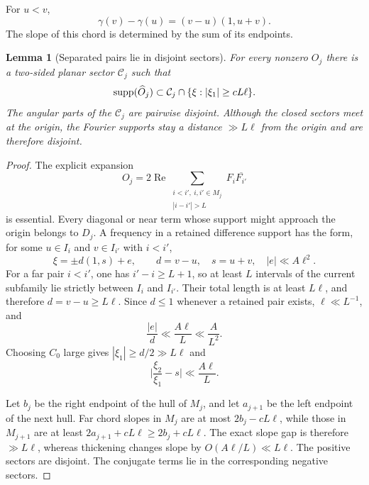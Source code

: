 \documentclass{amsart}
\numberwithin{equation}{section}
\newtheorem{lemma}[theorem]{Lemma}
\newcommand{\supp}{{\rm supp}}
\begin{document}
For $u<v$,
\begin{equation}\label{eq:chord-direction}
 \gamma(v)-\gamma(u)=(v-u)(1,u+v).
\end{equation}
The slope of this chord is determined by the sum of its endpoints.

\begin{lemma}[Separated pairs lie in disjoint sectors]\label{lem:chord-sectors}
For every nonzero $O_j$ there is a two-sided planar sector $\mathcal C_j$
such that
\[
 \supp(\widehat O_j)
 \subset \mathcal C_j\cap\{\xi:|\xi_1|\ge cL\ell\}.
\]
The angular parts of the $\mathcal C_j$ are pairwise disjoint.  Although the
closed sectors meet at the origin, the Fourier supports stay a distance
$\gg L\ell$ from the origin and are therefore disjoint.
\end{lemma}

\begin{proof}
The explicit expansion
\[
 O_j=2\operatorname{Re}
 \sum_{\substack{i<i',\ i,i'\in M_j\\
       |i-i'|>L}}
 F_i\overline{F_{i'}}
\]
is essential.  Every diagonal or near term whose support might approach
the origin belongs to $D_j$.  A frequency in a retained difference support
has the form, for some $u\in I_i$ and $v\in I_{i'}$ with $i<i'$,
\[
 \xi=\pm d(1,s)+e,
 \qquad d=v-u,\quad s=u+v,\quad |e|\ll A\ell^2.
\]
For a far pair $i<i'$, one has $i'-i\ge L+1$, so at least $L$ intervals of the
current subfamily lie strictly between $I_i$ and $I_{i'}$.  Their total length
is at least $L\ell$, and therefore $d=v-u\ge L\ell$.  Since $d\le1$ whenever a
retained pair exists, $\ell\ll L^{-1}$, and
\[
 \frac{|e|}{d}\ll\frac{A\ell}{L}\ll\frac{A}{L^2}.
\]
Choosing $C_0$ large gives $|\xi_1|\ge d/2\gg L\ell$ and
\[
 \Big|\frac{\xi_2}{\xi_1}-s\Big|
 \ll\frac{A\ell}{L}.
\]

Let $b_j$ be the right endpoint of the hull of $M_j$, and let $a_{j+1}$ be
the left endpoint of the next hull.  Far chord slopes in $M_j$ are at most
$2b_j-cL\ell$, while those in $M_{j+1}$ are at least
$2a_{j+1}+cL\ell\ge2b_j+cL\ell$.  The exact slope gap is therefore
$\gg L\ell$, whereas thickening changes slope by
$O(A\ell/L)\ll L\ell$.  The positive sectors are disjoint.  The conjugate
terms lie in the corresponding negative sectors.
\end{proof}
\end{document}
